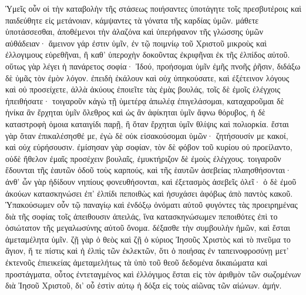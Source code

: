 Ὑμεῖς οὖν οἱ τὴν καταβολὴν τῆς στάσεως ποιήσαντες ὑποτάγητε τοῖς πρεσβυτέροις καὶ παιδεύθητε εἰς μετάνοιαν, κάμψαντες τὰ γόνατα τῆς καρδίας ὑμῶν. μάθετε ὑποτάσσεσθαι, ἀποθέμενοι τὴν ἀλαζόνα καὶ ὑπερήφανον τῆς γλώσσης ὑμῶν αὐθάδειαν· ἄμεινον γάρ ἐστιν ὑμῖν, ἐν τῷ ποιμνίῳ τοῦ Χριστοῦ μικροὺς καὶ ἐλλογιμους εὑρεθῆναι, ἢ καθ’ ὑπεροχὴν δοκοῦντας ἐκριφῆναι ἐκ τῆς ἐλπίδος αὐτοῦ. οὕτως γὰρ λέγει ἡ πανάρετος σοφία· Ἰδού, προήσομαι ὑμῖν ἐμῆς πνοῆς ῥῆσιν, διδάξω δὲ ὑμᾶς τὸν ἐμὸν λόγον. ἐπειδὴ ἐκάλουν καὶ οὐχ ὑπηκούσατε, καὶ ἐξέτεινον λόγους καὶ οὐ προσείχετε, ἀλλὰ ἀκύους ἐποιεῖτε τὰς ἐμὰς βουλάς, τοῖς δὲ ἐμοῖς ἐλέγχοις ἠπειθήσατε· τοιγαροῦν κἀγὼ τῇ ὑμετέρᾳ ἀπωλέᾳ ἐπιγελάσομαι, καταχαροῦμαι δὲ ἡνίκα ἂν ἔρχηται ὑμῖν ὄλεθρος καὶ ὡς ἂν ἀφίκηται ὑμῖν ἄφνω θόρυβος, ἡ δὲ καταστροφὴ ὁμοια καταιγίδι παρῇ, ἢ ὅταν ἔρχηται ὑμῖν θλίψις καὶ πολιορκία. ἔσται γὰρ ὅταν ἐπικαλέσησθέ με, ἐγὼ δὲ οὐκ εἰσακούσομαι ὑμῶν· ζητήσουσίν με κακοί, καὶ οὐχ εὑρήσουσιν. ἐμίσησαν γὰρ σοφίαν, τὸν δὲ φόβον τοῦ κυρίου οὐ προείλαντο, οὐδὲ ἤθελον ἐμαῖς προσέχειν βουλαῖς, ἐμυκτήριζον δὲ ἐμοὺς ἐλέγχους. τοιγαροῦν ἔδουνται τῆς ἑαυτῶν ὁδοῦ τοὺς καρπούς, καὶ τῆς ἑαυτῶν ἀσεβείας πλαησθήσονται· ἀνθ’ ὧν γὰρ ἠδίδουν νηπίους φονευθήσονται, καὶ ἐξετασμὸς ἀσεβεῖς ὀλεῖ· ὁ δὲ ἐμοῦ ἀκούων κατασκηνώσει ἐπ’ ἐλπίδι πεποιθὼς καὶ ἡσυχάσει ἀφόβως ἀπὸ παντὸς κακοῦ. 
Ὑπακούσωμεν οὖν τῷ παναγίῳ καὶ ἐνδόξῳ ὀνόματι αὐτοῦ φυγόντες τὰς προειρημένας διὰ τῆς σοφίας τοῖς ἀπειθουσιν ἀπειλάς, ἵνα κατασκηνώσωμεν πεποιθότες ἐπὶ το ὁσιώτατον τῆς μεγαλωσύνης αὐτοῦ ὄνομα. δέξασθε τὴν συμβουλὴν ἡμῶν, καὶ ἔσται ἀμεταμέλητα ὑμῖν. ζῇ γὰρ ὁ θεὸς καὶ ζῇ ὁ κύριος Ἰησοῦς Χριστὸς καὶ τὸ πνεῦμα το ἅγιον, ἥ τε πίστις καὶ ἡ ἐλπὶς τῶν ἐκλεκτῶν, ὅτι ὁ ποιήσας ἐν ταπεινοφροσύνῃ μετ’ ἐκτενοῦς ἐπιεικείας ἀμεταμελήτως τὰ ὑπὸ τοῦ θεοῦ δεδομένα δικαιώματα καὶ προστάγματα, οὗτος ἐντεταγμένος καὶ ἐλλόγιμος ἔσται εἰς τὸν ἀριθμὸν τῶν σωζομένων διὰ Ἰησοῦ Χριστοῦ, δι’ οὗ ἐστὶν αὐτῳ ἡ δόξα εἰς τοὺς αἰῶνας τῶν αἰώνων. ἀμήν.

